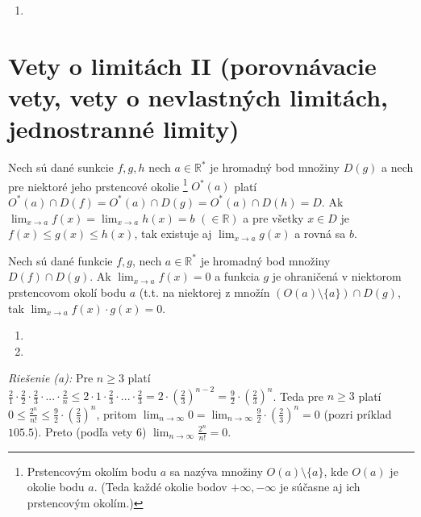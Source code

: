 \begin{enumerate}[resume]
	\item {}
\end{enumerate}

\section{Vety o limitách II (porovnávacie vety, vety o nevlastných limitách, jednostranné limity)}

\begin{veta}
Nech sú dané sunkcie $f,g,h$ nech $a \in \mathbb{R^*}$ je hromadný bod množiny $D(g)$ a nech pre niektoré jeho prstencové okolie \footnote{Prstencovým okolím bodu $a$ sa nazýva množiny $O(a) \setminus \{ a\}$, kde $O(a)$ je okolie bodu $a$. (Teda každé okolie bodov $+\infty,-\infty$ je súčasne aj ich prstencovým okolím.)} $O^*(a)$ platí $O^*(a) \cap D(f)=O^*(a)\cap D(g)=O^*(a) \cap D(h)=D$. Ak $\lim_{x \rightarrow a} f(x)=\lim_{x \rightarrow a} h(x)=b$  $( \in \mathbb{R})$ a pre všetky $x \in D$ je $f(x) \leq g(x) \leq h(x)$, tak existuje aj $\lim_{x \rightarrow a} g(x)$ a rovná sa $b$.
\end{veta}

\begin{veta}
Nech sú dané funkcie $f,g$, nech $a \in \mathbb{R^*}$ je hromadný bod množiny $D(f) \cap D(g)$. Ak $\lim_{x \rightarrow a} f(x)=0$ a funkcia $g$ je ohraničená v niektorom prstencovom okolí bodu $a$ (t.t. na niektorej z množín $(O(a) \setminus \{ a\})\cap D(g)$, tak $\lim_{x \rightarrow a} f(x) \cdot g(x)=0$.
\end{veta}

\begin{enumerate}[resume]
	\item {}
	\item {}
\end{enumerate}

\textit{Riešenie (a):}
Pre $n \geq 3$ platí $\frac{2}{1}\cdot \frac{2}{2}\cdot \frac{2}{3}\cdot ... \cdot \frac{2}{n} \leq 2 \cdot 1 \cdot \frac{2}{3} \cdot ... \cdot \frac{2}{3}=2 \cdot (\frac{2}{3})^{n-2}=\frac{9}{2} \cdot (\frac{2}{3})^n$. Teda pre $n \geq 3$ platí $0 \leq \frac{2^n}{n!}\leq \frac{9}{2}\cdot (\frac{2}{3})^n$, pritom $\lim_{n \rightarrow \infty} 0=\lim_{n \rightarrow \infty} \frac{9}{2} \cdot (\frac{2}{3})^n=0$ (pozri príklad $105.5$). Preto (podľa vety $6$) $\lim_{n \rightarrow \infty} \frac{2^n}{n!}=0$.

